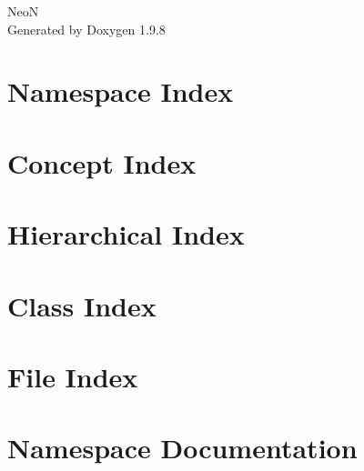 \documentclass[twoside]{book}
\newcommand{\+}{\discretionary{\mbox{\scriptsize$\hookleftarrow$}}{}{}}
\newcommand{\clearemptydoublepage}{%
    \newpage{\pagestyle{empty}\cleardoublepage}%
  }
\begin{document}
  \raggedbottom
    \hypersetup{pageanchor=false,
                bookmarksnumbered=true,
                pdfencoding=unicode
               }
  \begin{titlepage}
  \vspace*{7cm}
  \begin{center}%
  {\Large NeoN}\\
  \vspace*{1cm}
  {\large Generated by Doxygen 1.9.8}\\
  \end{center}
  \end{titlepage}
  \clearemptydoublepage
  \tableofcontents
  \clearemptydoublepage
  \hypersetup{pageanchor=true}
\chapter{Namespace Index}

\chapter{Concept Index}

\chapter{Hierarchical Index}

\chapter{Class Index}

\chapter{File Index}

\chapter{Namespace Documentation}















\end{document}

